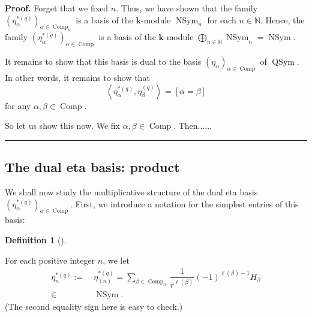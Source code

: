 \documentclass[numbers=enddot,12pt,final,onecolumn,notitlepage]{scrartcl}%
\theoremstyle{definition}
\newtheorem{defi}[theo]{Definition}
\newenvironment{definition}[1][]
{\begin{defi}[#1]\begin{leftbar}}
{\end{leftbar}\end{defi}}
\newenvironment{proof}[1][Proof]{\noindent\textbf{#1.} }{\ \rule{0.5em}{0.5em}}
\let\sumnonlimits\sum
\let\oplusnonlimits\bigoplus
\renewcommand{\sum}{\sumnonlimits\limits}
\renewcommand{\bigoplus}{\oplusnonlimits\limits}
\newenvironment{noncompile}{}{}
\begin{document}
\begin{proof}
\begin{noncompile}
Forget that we fixed $n$. Thus, we have shown that the family $\left(
\eta_{\alpha}^{\ast\left(  q\right)  }\right)  _{\alpha\in\operatorname*{Comp}%
\nolimits_{n}}$ is a basis of the $\mathbf{k}$-module $\operatorname*{NSym}%
\nolimits_{n}$ for each $n\in\mathbb{N}$. Hence, the family $\left(
\eta_{\alpha}^{\ast\left(  q\right)  }\right)  _{\alpha\in\operatorname*{Comp}%
}$ is a basis of the $\mathbf{k}$-module $\bigoplus_{n\in\mathbb{N}%
}\operatorname*{NSym}\nolimits_{n}=\operatorname*{NSym}$.

It remains to show that this basis is dual to the basis $\left(  \eta_{\alpha
}\right)  _{\alpha\in\operatorname*{Comp}}$ of $\operatorname*{QSym}$. In
other words, it remains to show that
\begin{equation}
\left\langle \eta_{\alpha}^{\ast\left(  q\right)  },\eta_{\beta}^{\left(
q\right)  }\right\rangle =\left[  \alpha=\beta\right]
\label{pf.prop.etastar-dual-basis.goal}%
\end{equation}
for any $\alpha,\beta\in\operatorname*{Comp}$.

So let us show this now. We fix $\alpha,\beta\in\operatorname*{Comp}$. Then......
\end{noncompile}
\end{proof}

\subsection{The dual eta basis: product}

We shall now study the multiplicative structure of the dual eta basis $\left(
\eta_{\alpha}^{\ast\left(  q\right)  }\right)  _{\alpha\in\operatorname*{Comp}%
}$. First, we introduce a notation for the simplest entries of this basis:

\begin{definition}
\label{def.etastarn}For each positive integer $n$, we let%
\begin{align}
\eta_{n}^{\ast\left(  q\right)  }:=  &  \ \eta_{\left(  n\right)  }%
^{\ast\left(  q\right)  }=\sum_{\beta\in\operatorname*{Comp}\nolimits_{n}%
}\dfrac{1}{r^{\ell\left(  \beta\right)  }}\left(  -1\right)  ^{\ell\left(
\beta\right)  -1}H_{\beta}\label{eq.def.etastarn.eq}\\
\in &  \ \operatorname*{NSym}.\nonumber
\end{align}
(The second equality sign here is easy to check.\footnotemark)
\end{definition}
\end{document}
